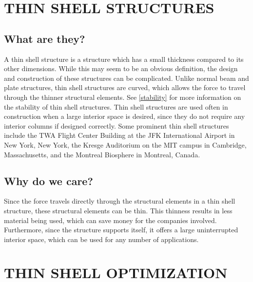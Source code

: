 \documentclass{thesis}
\begin{document}
\section{THIN SHELL STRUCTURES} \label{thinshell}

\subsection{What are they?}
A thin shell structure is a structure which has a small thickness compared to its other dimensions.  While this may seem to be
an obvious definition, the design and construction of these structures can be complicated.  Unlike normal beam and plate structures,
thin shell structures are curved, which allows the force to travel through the thinner structural elements.  See \ref{stability} for
more information on the stability of thin shell structures.  Thin shell structures are used often in construction when a large interior
space is desired, since they do not require any interior columns if designed correctly.  Some prominent thin shell structures include
the TWA Flight Center Building at the JFK International Airport in New York, New York, the Kresge Auditorium on the MIT campus in
Cambridge, Massachusetts, and the Montreal Biosphere in Montreal, Canada.

\subsection{Why do we care?}
Since the force travels directly through the structural elements in a thin shell structure, these structural elements can be thin.  This
thinness results in less material being used, which can save money for the companies involved.  Furthermore, since the structure supports
itself, it offers a large uninterrupted interior space, which can be used for any number of applications.


\section{THIN SHELL OPTIMIZATION}
\end{document}
